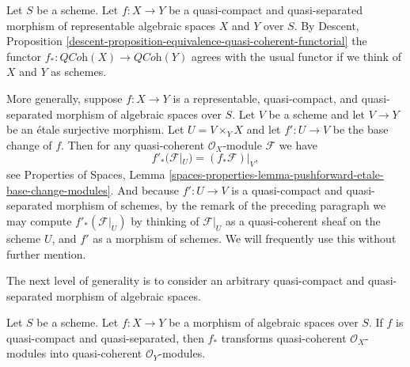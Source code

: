 \noindent
Let $S$ be a scheme. Let $f : X \to Y$ be a quasi-compact and
quasi-separated morphism of representable algebraic spaces $X$
and $Y$ over $S$. By
Descent,
Proposition \ref{descent-proposition-equivalence-quasi-coherent-functorial}
the functor $f_* : \textit{QCoh}(X) \to \textit{QCoh}(Y)$ agrees with the
usual functor if we think of $X$ and $Y$ as schemes.

\medskip\noindent
More generally, suppose $f : X \to Y$ is a representable, quasi-compact, and
quasi-separated morphism of algebraic spaces over $S$. Let $V$ be a scheme
and let $V \to Y$ be an \'etale surjective morphism. Let $U = V \times_Y X$
and let $f' : U \to V$ be the base change of $f$. Then for any
quasi-coherent $\mathcal{O}_X$-module $\mathcal{F}$ we have
\begin{equation}
\label{equation-representable-pushforward}
f'_*(\mathcal{F}|_U) = (f_*\mathcal{F})|_V,
\end{equation}
see
Properties of Spaces,
Lemma \ref{spaces-properties-lemma-pushforward-etale-base-change-modules}.
And because $f' : U \to V$ is a quasi-compact and quasi-separated
morphism of schemes, by the remark of the preceding paragraph we may
compute $f'_*(\mathcal{F}|_U)$ by thinking of $\mathcal{F}|_U$ as a
quasi-coherent sheaf on the scheme $U$, and $f'$ as a morphism of schemes.
We will frequently use this without further mention.

\medskip\noindent
The next level of generality is to consider an arbitrary
quasi-compact and quasi-separated morphism of algebraic spaces.

\begin{lemma}
\label{lemma-pushforward}
Let $S$ be a scheme.
Let $f : X \to Y$ be a morphism of algebraic spaces over $S$.
If $f$ is quasi-compact and quasi-separated, then $f_*$ transforms
quasi-coherent $\mathcal{O}_X$-modules into
quasi-coherent $\mathcal{O}_Y$-modules.
\end{lemma}

